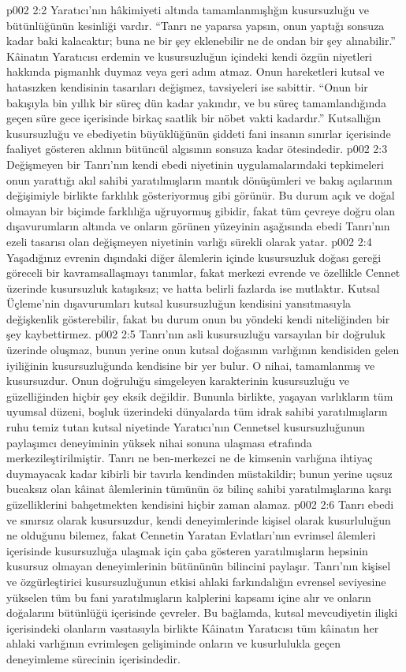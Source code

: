 \vs p002 2:2 Yaratıcı’nın hâkimiyeti altında tamamlanmışlığın kusursuzluğu ve bütünlüğünün kesinliği vardır. “Tanrı ne yaparsa yapsın, onun yaptığı sonsuza kadar baki kalacaktır; buna ne bir şey eklenebilir ne de ondan bir şey alınabilir.” Kâinatın Yaratıcısı erdemin ve kusursuzluğun içindeki kendi özgün niyetleri hakkında pişmanlık duymaz veya geri adım atmaz. Onun hareketleri kutsal ve hatasızken kendisinin tasarıları değişmez, tavsiyeleri ise sabittir. “Onun bir bakışıyla bin yıllık bir süreç dün kadar yakındır, ve bu süreç tamamlandığında geçen süre gece içerisinde birkaç saatlik bir nöbet vakti kadardır.” Kutsallığın kusursuzluğu ve ebediyetin büyüklüğünün şiddeti fani insanın sınırlar içerisinde faaliyet gösteren aklının bütüncül algısının sonsuza kadar ötesindedir.
\vs p002 2:3 Değişmeyen bir Tanrı’nın kendi ebedi niyetinin uygulamalarındaki tepkimeleri onun yarattığı akıl sahibi yaratılmışların mantık dönüşümleri ve bakış açılarının değişimiyle birlikte farklılık gösteriyormuş gibi görünür. Bu durum açık ve doğal olmayan bir biçimde farklılığa uğruyormuş gibidir, fakat tüm çevreye doğru olan dışavurumların altında ve onların görünen yüzeyinin aşağısında ebedi Tanrı’nın ezeli tasarısı olan değişmeyen niyetinin varlığı sürekli olarak yatar.
\vs p002 2:4 Yaşadığınız evrenin dışındaki diğer âlemlerin içinde kusursuzluk doğası gereği göreceli bir kavramsallaşmayı tanımlar, fakat merkezi evrende ve özellikle Cennet üzerinde kusursuzluk katışıksız; ve hatta belirli fazlarda ise mutlaktır. Kutsal Üçleme’nin dışavurumları kutsal kusursuzluğun kendisini yansıtmasıyla değişkenlik gösterebilir, fakat bu durum onun bu yöndeki kendi niteliğinden bir şey kaybettirmez.
\vs p002 2:5 Tanrı’nın asli kusursuzluğu varsayılan bir doğruluk üzerinde oluşmaz, bunun yerine onun kutsal doğasının varlığının kendisiden gelen iyiliğinin kusursuzluğunda kendisine bir yer bulur. O nihai, tamamlanmış ve kusursuzdur. Onun doğruluğu simgeleyen karakterinin kusursuzluğu ve güzelliğinden hiçbir şey eksik değildir. Bununla birlikte, yaşayan varlıkların tüm uyumsal düzeni, boşluk üzerindeki dünyalarda tüm idrak sahibi yaratılmışların ruhu temiz tutan kutsal niyetinde Yaratıcı’nın Cennetsel kusursuzluğunun paylaşımcı deneyiminin yüksek nihai sonuna ulaşması etrafında merkezileştirilmiştir. Tanrı ne ben\hyp{}merkezci ne de kimsenin varlığına ihtiyaç duymayacak kadar kibirli bir tavırla kendinden müstakildir; bunun yerine uçsuz bucaksız olan kâinat âlemlerinin tümünün öz bilinç sahibi yaratılmışlarına karşı güzelliklerini bahşetmekten kendisini hiçbir zaman alamaz.
\vs p002 2:6 Tanrı ebedi ve sınırsız olarak kusursuzdur, kendi deneyimlerinde kişisel olarak kusurluluğun ne olduğunu bilemez, fakat Cennetin Yaratan Evlatları’nın evrimsel âlemleri içerisinde kusursuzluğa ulaşmak için çaba gösteren yaratılmışların hepsinin kusursuz olmayan deneyimlerinin bütününün bilincini paylaşır. Tanrı’nın kişisel ve özgürleştirici kusursuzluğunun etkisi ahlaki farkındalığın evrensel seviyesine yükselen tüm bu fani yaratılmışların kalplerini kapsamı içine alır ve onların doğalarını bütünlüğü içerisinde çevreler. Bu bağlamda, kutsal mevcudiyetin ilişki içerisindeki olanların vasıtasıyla birlikte Kâinatın Yaratıcısı tüm kâinatın her ahlaki varlığının evrimleşen gelişiminde onların  ve kusurlulukla geçen deneyimleme sürecinin içerisindedir.

